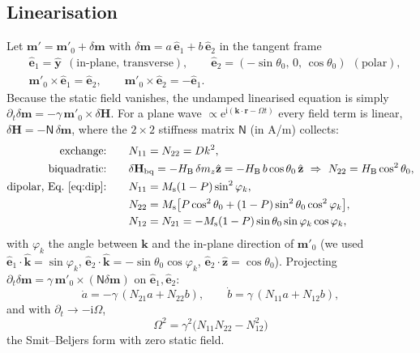 \documentclass[11pt,a4paper]{article}
\newcommand{\vect}[1]{\mathbf{#1}}
\newcommand{\uv}[1]{\hat{\mathbf{#1}}}
\newcommand{\Ms}{M_\mathrm{s}}
\newcommand{\HB}{H_\mathrm{B}}
\newcommand{\ee}{\mathrm{e}}
\newcommand{\ii}{\mathrm{i}}
\begin{document}
\subsection{Linearisation}
Let $\vect m'=\vect m'_0+\delta\vect m$ with $\delta\vect m=a\,\uv e_1+b\,\uv e_2$ in the tangent frame
\begin{equation}
\begin{aligned}
&\uv e_1=\uv y\ \ (\text{in-plane, transverse}),\qquad
\uv e_2=(-\sin\theta_0,\,0,\,\cos\theta_0)\ \ (\text{polar}),\\
&\vect m'_0\times\uv e_1=\uv e_2,\qquad \vect m'_0\times\uv e_2=-\uv e_1 .
\end{aligned}
\end{equation}
Because the static field vanishes, the undamped linearised equation is simply
$\partial_t\delta\vect m=-\gamma\,\vect m'_0\times\delta\vect H$.
For a plane wave $\propto\ee^{\ii(\vect k\cdot\vect r-\Omega t)}$ every field term is linear,
$\delta\vect H=-\mathsf N\,\delta\vect m$, where the $2\times2$ stiffness matrix $\mathsf N$ (in A/m) collects:
\begin{align}
\text{exchange:}&\qquad N_{11}=N_{22}=Dk^2,\\
\text{biquadratic:}&\qquad \delta\vect H_\mathrm{bq}=-\HB\,\delta m_z\uv z=-\HB\,b\cos\theta_0\,\uv z
\ \Rightarrow\ N_{22}=\HB\cos^2\theta_0,\\
\text{dipolar, Eq.~\eqref{eq:dip}:}&\qquad
N_{11}=\Ms(1-P)\sin^2\varphi_k,\nonumber\\
&\qquad N_{22}=\Ms\big[P\cos^2\theta_0+(1-P)\sin^2\theta_0\cos^2\varphi_k\big],\nonumber\\
&\qquad N_{12}=N_{21}=-\Ms(1-P)\sin\theta_0\sin\varphi_k\cos\varphi_k ,
\end{align}
with $\varphi_k$ the angle between $\vect k$ and the in-plane direction of $\vect m'_0$
(we used $\uv e_1\cdot\uv k=\sin\varphi_k$, $\uv e_2\cdot\uv k=-\sin\theta_0\cos\varphi_k$,
$\uv e_2\cdot\uv z=\cos\theta_0$).  Projecting $\partial_t\delta\vect m=\gamma\,\vect m'_0\times(\mathsf N\delta\vect m)$
on $\uv e_1,\uv e_2$:
\begin{equation}
\dot a=-\gamma\,(N_{21}a+N_{22}b),\qquad \dot b=\gamma\,(N_{11}a+N_{12}b),
\end{equation}
and with $\partial_t\to-\ii\Omega$,
\begin{equation}
\boxed{\;\Omega^2=\gamma^2\big(N_{11}N_{22}-N_{12}^2\big)\;}
\label{eq:Omega2}
\end{equation}
the Smit--Beljers form with zero static field.
\end{document}
